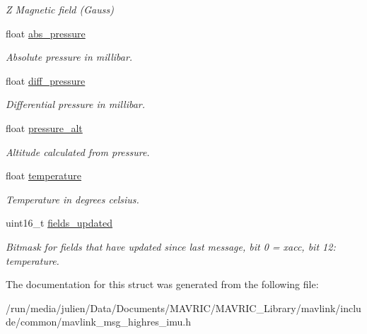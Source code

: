 \begin{DoxyCompactItemize}
\begin{DoxyCompactList}\small\item\em Z Magnetic field (Gauss) \end{DoxyCompactList}\item 
\hypertarget{struct____mavlink__highres__imu__t_a0db713a894b40a11ee5b0cddc1629353}{float \hyperlink{struct____mavlink__highres__imu__t_a0db713a894b40a11ee5b0cddc1629353}{abs\+\_\+pressure}}\label{struct____mavlink__highres__imu__t_a0db713a894b40a11ee5b0cddc1629353}

\begin{DoxyCompactList}\small\item\em Absolute pressure in millibar. \end{DoxyCompactList}\item 
\hypertarget{struct____mavlink__highres__imu__t_a5902061bb3028121e55ce9641e844334}{float \hyperlink{struct____mavlink__highres__imu__t_a5902061bb3028121e55ce9641e844334}{diff\+\_\+pressure}}\label{struct____mavlink__highres__imu__t_a5902061bb3028121e55ce9641e844334}

\begin{DoxyCompactList}\small\item\em Differential pressure in millibar. \end{DoxyCompactList}\item 
\hypertarget{struct____mavlink__highres__imu__t_ae540d0d0572455b1fc44123d3a3b6405}{float \hyperlink{struct____mavlink__highres__imu__t_ae540d0d0572455b1fc44123d3a3b6405}{pressure\+\_\+alt}}\label{struct____mavlink__highres__imu__t_ae540d0d0572455b1fc44123d3a3b6405}

\begin{DoxyCompactList}\small\item\em Altitude calculated from pressure. \end{DoxyCompactList}\item 
\hypertarget{struct____mavlink__highres__imu__t_add75673ef20a41e9548b3b583762d4b4}{float \hyperlink{struct____mavlink__highres__imu__t_add75673ef20a41e9548b3b583762d4b4}{temperature}}\label{struct____mavlink__highres__imu__t_add75673ef20a41e9548b3b583762d4b4}

\begin{DoxyCompactList}\small\item\em Temperature in degrees celsius. \end{DoxyCompactList}\item 
\hypertarget{struct____mavlink__highres__imu__t_a0723ff71a7057f3f96eb64ac73be64dc}{uint16\+\_\+t \hyperlink{struct____mavlink__highres__imu__t_a0723ff71a7057f3f96eb64ac73be64dc}{fields\+\_\+updated}}\label{struct____mavlink__highres__imu__t_a0723ff71a7057f3f96eb64ac73be64dc}

\begin{DoxyCompactList}\small\item\em Bitmask for fields that have updated since last message, bit 0 = xacc, bit 12\+: temperature. \end{DoxyCompactList}\end{DoxyCompactItemize}


The documentation for this struct was generated from the following file\+:\begin{DoxyCompactItemize}
\item 
/run/media/julien/\+Data/\+Documents/\+M\+A\+V\+R\+I\+C/\+M\+A\+V\+R\+I\+C\+\_\+\+Library/mavlink/include/common/mavlink\+\_\+msg\+\_\+highres\+\_\+imu.\+h\end{DoxyCompactItemize}
